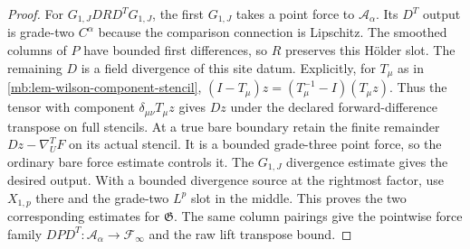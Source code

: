 \documentclass[11pt,letterpaper,reqno]{amsart}
\numberwithin{equation}{section}
\theoremstyle{definition}
\theoremstyle{remark}
\begin{document}
\begin{proof}
For \(G_{1,J}DRD^TG_{1,J}\), the first \(G_{1,J}\) takes a point force to \(\mathcal A_\alpha\). Its \(D^T\) output is grade-two \(C^\alpha\) because the comparison connection is Lipschitz. The smoothed columns of \(P\) have bounded first differences, so \(R\) preserves this H\"older slot. The remaining \(D\) is a field divergence of this site datum. Explicitly, for \(T_\mu\) as in \cref{mb:lem-wilson-component-stencil}, \((I-T_\mu)z=(T_\mu^{-1}-I)(T_\mu z)\). Thus the tensor with component \(\delta_{\mu\nu}T_\mu z\) gives \(Dz\) under the declared forward-difference transpose on full stencils. At a true bare boundary retain the finite remainder \(Dz-\nabla_U^TF\) on its actual stencil. It is a bounded grade-three point force, so the ordinary bare force estimate controls it. The \(G_{1,J}\) divergence estimate gives the desired output. With a bounded divergence source at the rightmost factor, use \(X_{1,p}\) there and the grade-two \(L^p\) slot in the middle. This proves the two corresponding estimates for \(\mathfrak G\). The same column pairings give the pointwise force family \(DPD^T:\mathcal A_\alpha\to\mathcal F_\infty\) and the raw lift transpose bound.
\end{proof}
\end{document}
